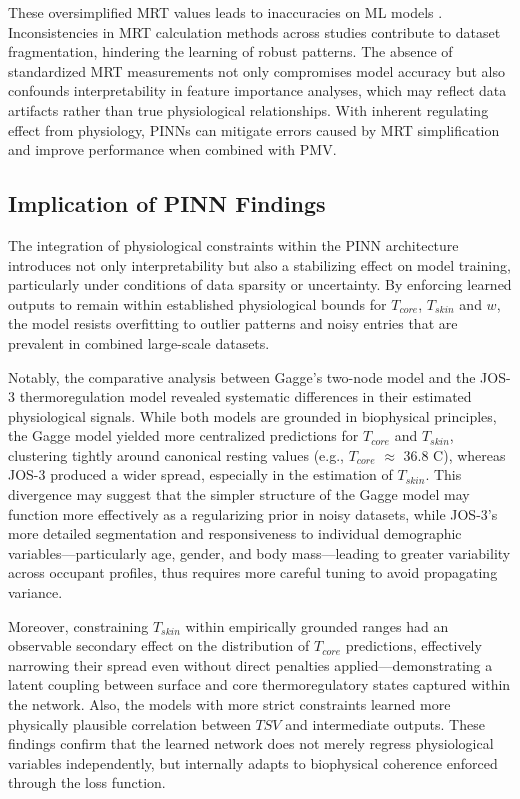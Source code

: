 These oversimplified MRT values leads to inaccuracies on ML models \cite{luo_comparing_2020}. Inconsistencies in MRT calculation methods across studies contribute to dataset fragmentation, hindering the learning of robust patterns. The absence of standardized MRT measurements not only compromises model accuracy but also confounds interpretability in feature importance analyses, which may reflect data artifacts rather than true physiological relationships. With inherent regulating effect from physiology, PINNs can mitigate errors caused by MRT simplification and improve performance when combined with PMV.

\subsection{Implication of PINN Findings}

The integration of physiological constraints within the PINN architecture introduces not only interpretability but also a stabilizing effect on model training, particularly under conditions of data sparsity or uncertainty. By enforcing learned outputs to remain within established physiological bounds for $T_{core}$, $T_{skin}$ and $w$, the model resists overfitting to outlier patterns and noisy entries that are prevalent in combined large-scale datasets.

Notably, the comparative analysis between Gagge’s two-node model and the JOS-3 thermoregulation model revealed systematic differences in their estimated physiological signals. While both models are grounded in biophysical principles, the Gagge model yielded more centralized predictions for $T_{core}$ and $T_{skin}$, clustering tightly around canonical resting values (e.g., $T_{core}$ $\approx$ 36.8 \textdegree{}C), whereas JOS-3 produced a wider spread, especially in the estimation of $T_{skin}$. This divergence may suggest that the simpler structure of the Gagge model may function more effectively as a regularizing prior in noisy datasets, while JOS-3’s more detailed segmentation and responsiveness to individual demographic variables—particularly age, gender, and body mass—leading to greater variability across occupant profiles, thus requires more careful tuning to avoid propagating variance.

Moreover, constraining $T_{skin}$ within empirically grounded ranges had an observable secondary effect on the distribution of $T_{core}$ predictions, effectively narrowing their spread even without direct penalties applied—demonstrating a latent coupling between surface and core thermoregulatory states captured within the network. Also, the models with more strict constraints learned more physically plausible correlation between $TSV$ and intermediate outputs. These findings confirm that the learned network does not merely regress physiological variables independently, but internally adapts to biophysical coherence enforced through the loss function.

